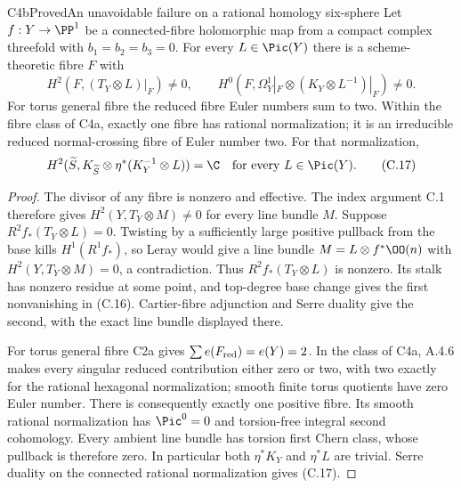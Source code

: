\begin{statement}{C4b}{Proved}{An unavoidable failure on a rational homology six-sphere}
Let $f:Y\to\PP^1$ be a connected-fibre holomorphic map from a compact complex threefold with $b_1=b_2=b_3=0$. For every $L\in\Pic(Y)$ there is a scheme-theoretic fibre $F$ with
\[
 H^2(F,(T_Y\otimes L)|_F)\ne0,\qquad
 H^0(F,\Omega_Y^1|_F\otimes(K_Y\otimes L^{-1})|_F)\ne0. \tag{C.16}
\]
For torus general fibre the reduced fibre Euler numbers sum to two. Within the fibre class of C4a, exactly one fibre has rational normalization; it is an irreducible reduced normal-crossing fibre of Euler number two. For that normalization,
\[
H^2(\widetilde S,K_{\widetilde S}\otimes
             \eta^*(K_Y^{-1}\otimes L))=\C
\quad\hbox{for every }L\in\Pic(Y).                    \tag{C.17}
\]
\end{statement}
\begin{proof}
The divisor of any fibre is nonzero and effective. The index argument C.1 therefore gives $H^2(Y,T_Y\otimes M)\ne0$ for every line bundle $M$. Suppose $R^2f_*(T_Y\otimes L)=0$. Twisting by a sufficiently large positive pullback from the base kills $H^1(R^1f_*)$, so Leray would give a line bundle $M=L\otimes f^*\OO(n)$ with $H^2(Y,T_Y\otimes M)=0$, a contradiction. Thus $R^2f_*(T_Y\otimes L)$ is nonzero. Its stalk has nonzero residue at some point, and top-degree base change gives the first nonvanishing in (C.16). Cartier-fibre adjunction and Serre duality give the second, with the exact line bundle displayed there.

For torus general fibre C2a gives $\sum e(F_{\rm red})=e(Y)=2$. In the class of C4a, A.4.6 makes every singular reduced contribution either zero or two, with two exactly for the rational hexagonal normalization; smooth finite torus quotients have zero Euler number. There is consequently exactly one positive fibre. Its smooth rational normalization has $\Pic^0=0$ and torsion-free integral second cohomology. Every ambient line bundle has torsion first Chern class, whose pullback is therefore zero. In particular both $\eta^*K_Y$ and $\eta^*L$ are trivial. Serre duality on the connected rational normalization gives (C.17).
\end{proof}



